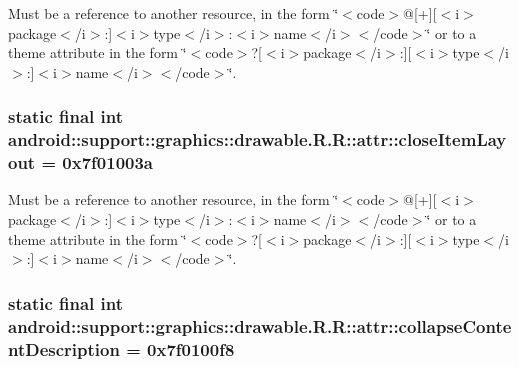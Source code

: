 Must be a reference to another resource, in the form \char`\"{}$<$code$>$@\mbox{[}+\mbox{]}\mbox{[}$<$i$>$package$<$/i$>$:\mbox{]}$<$i$>$type$<$/i$>$:$<$i$>$name$<$/i$>$$<$/code$>$\char`\"{} or to a theme attribute in the form \char`\"{}$<$code$>$?\mbox{[}$<$i$>$package$<$/i$>$:\mbox{]}\mbox{[}$<$i$>$type$<$/i$>$:\mbox{]}$<$i$>$name$<$/i$>$$<$/code$>$\char`\"{}. \hypertarget{classandroid_1_1support_1_1graphics_1_1drawable_1_1_r_1_1attr_08717f6a998c33ef0486805422e3490d}{
\subsubsection[{closeItemLayout}]{\setlength{\rightskip}{0pt plus 5cm}static final int android::support::graphics::drawable.R.R::attr::closeItemLayout = 0x7f01003a}}
\label{classandroid_1_1support_1_1graphics_1_1drawable_1_1_r_1_1attr_08717f6a998c33ef0486805422e3490d}


Must be a reference to another resource, in the form \char`\"{}$<$code$>$@\mbox{[}+\mbox{]}\mbox{[}$<$i$>$package$<$/i$>$:\mbox{]}$<$i$>$type$<$/i$>$:$<$i$>$name$<$/i$>$$<$/code$>$\char`\"{} or to a theme attribute in the form \char`\"{}$<$code$>$?\mbox{[}$<$i$>$package$<$/i$>$:\mbox{]}\mbox{[}$<$i$>$type$<$/i$>$:\mbox{]}$<$i$>$name$<$/i$>$$<$/code$>$\char`\"{}. \hypertarget{classandroid_1_1support_1_1graphics_1_1drawable_1_1_r_1_1attr_9ba49a22518bcd25cdc882f626fc6f02}{
\subsubsection[{collapseContentDescription}]{\setlength{\rightskip}{0pt plus 5cm}static final int android::support::graphics::drawable.R.R::attr::collapseContentDescription = 0x7f0100f8}}
\label{classandroid_1_1support_1_1graphics_1_1drawable_1_1_r_1_1attr_9ba49a22518bcd25cdc882f626fc6f02}


